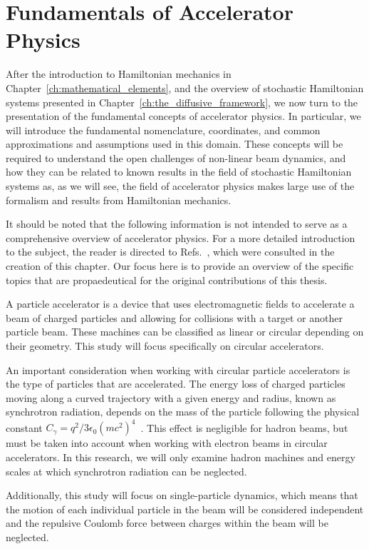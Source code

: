 
\chapter{Fundamentals of Accelerator Physics}\label{ch:accelerator_physics_fundamentals}

After the introduction to Hamiltonian mechanics in Chapter~\ref{ch:mathematical_elements}, and the overview of stochastic Hamiltonian systems presented in Chapter~\ref{ch:the_diffusive_framework}, we now turn to the presentation of the fundamental concepts of accelerator physics. In particular, we will introduce the fundamental nomenclature, coordinates, and common approximations and assumptions used in this domain. These concepts will be required to understand the open challenges of non-linear beam dynamics, and how they can be related to known results in the field of stochastic Hamiltonian systems as, as we will see, the field of accelerator physics makes large use of the formalism and results from Hamiltonian mechanics.

It should be noted that the following information is not intended to serve as a comprehensive overview of accelerator physics. For a more detailed introduction to the subject, the reader is directed to Refs.~\cite{Lee:2651939,wiedemann2015particle}, which were consulted in the creation of this chapter. Our focus here is to provide an overview of the specific topics that are propaedeutical for the original contributions of this thesis. 

A particle accelerator is a device that uses electromagnetic fields to accelerate a beam of charged particles and allowing for collisions with a target or another particle beam. These machines can be classified as linear or circular depending on their geometry. This study will focus specifically on circular accelerators.

An important consideration when working with circular particle accelerators is the type of particles that are accelerated. The energy loss of charged particles moving along a curved trajectory with a given energy and radius, known as synchrotron radiation, depends on the mass of the particle following the physical constant $C_\gamma = q^2 / 3\epsilon_0(mc^2)^4$~\cite{sands1970physics}. This effect is negligible for hadron beams, but must be taken into account when working with electron beams in circular accelerators. In this research, we will only examine hadron machines and energy scales at which synchrotron radiation can be neglected.

Additionally, this study will focus on single-particle dynamics, which means that the motion of each individual particle in the beam will be considered independent and the repulsive Coulomb force between charges within the beam will be neglected. 

